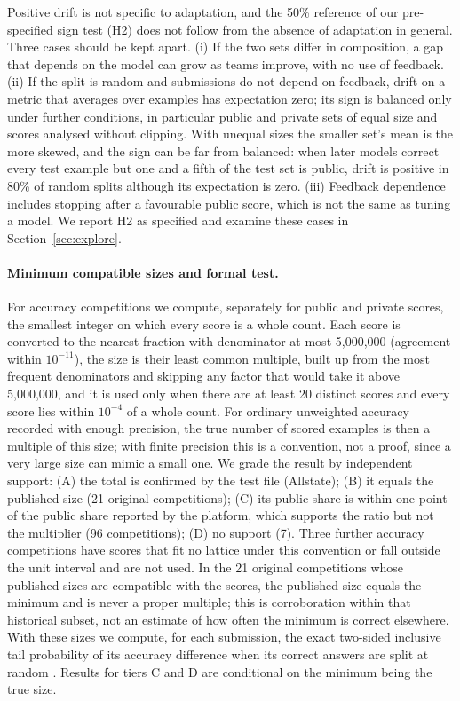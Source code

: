 \documentclass[10pt]{article}
\begin{document}
Positive drift is not specific to adaptation, and the 50\% reference of our pre-specified sign test (H2) does not follow from the absence of adaptation in general. Three cases should be kept apart. (i) If the two sets differ in composition, a gap that depends on the model can grow as teams improve, with no use of feedback. (ii) If the split is random and submissions do not depend on feedback, drift on a metric that averages over examples has expectation zero; its sign is balanced only under further conditions, in particular public and private sets of equal size and scores analysed without clipping. With unequal sizes the smaller set's mean is the more skewed, and the sign can be far from balanced: when later models correct every test example but one and a fifth of the test set is public, drift is positive in 80\% of random splits although its expectation is zero. (iii) Feedback dependence includes stopping after a favourable public score, which is not the same as tuning a model. We report H2 as specified and examine these cases in Section~\ref{sec:explore}.

\paragraph{Minimum compatible sizes and formal test.} For accuracy competitions we compute, separately for public and private scores, the smallest integer on which every score is a whole count. Each score is converted to the nearest fraction with denominator at most 5,000,000 (agreement within $10^{-11}$), the size is their least common multiple, built up from the most frequent denominators and skipping any factor that would take it above 5,000,000, and it is used only when there are at least 20 distinct scores and every score lies within $10^{-4}$ of a whole count. For ordinary unweighted accuracy recorded with enough precision, the true number of scored examples is then a multiple of this size; with finite precision this is a convention, not a proof, since a very large size can mimic a small one. We grade the result by independent support: (A) the total is confirmed by the test file (Allstate); (B) it equals the published size (21 original competitions); (C) its public share is within one point of the public share reported by the platform, which supports the ratio but not the multiplier (96 competitions); (D) no support (7). Three further accuracy competitions have scores that fit no lattice under this convention or fall outside the unit interval and are not used. In the 21 original competitions whose published sizes are compatible with the scores, the published size equals the minimum and is never a proper multiple; this is corroboration within that historical subset, not an estimate of how often the minimum is correct elsewhere. With these sizes we compute, for each submission, the exact two-sided inclusive tail probability of its accuracy difference when its correct answers are split at random \citep{roelofs2019meta}. Results for tiers C and D are conditional on the minimum being the true size.
\end{document}

